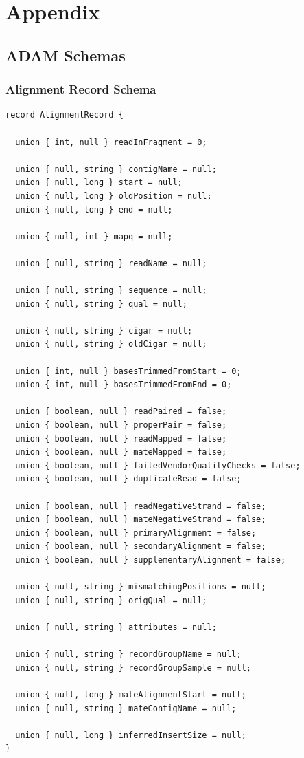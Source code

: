 \documentclass[phd]{ucbthesis}
\begin{document}
\backmatter




\appendix

\part{Appendix}

\chapter{ADAM Schemas}
\label{chap:schemas}

\section{Alignment Record Schema}
\label{sec:alignment-record}

\begin{lstlisting}[caption={ADAM} read schema]
record AlignmentRecord {
 
  union { int, null } readInFragment = 0;

  union { null, string } contigName = null;
  union { null, long } start = null;
  union { null, long } oldPosition = null;
  union { null, long } end = null;

  union { null, int } mapq = null;

  union { null, string } readName = null;

  union { null, string } sequence = null;
  union { null, string } qual = null;

  union { null, string } cigar = null;
  union { null, string } oldCigar = null;

  union { int, null } basesTrimmedFromStart = 0;
  union { int, null } basesTrimmedFromEnd = 0;

  union { boolean, null } readPaired = false;
  union { boolean, null } properPair = false;
  union { boolean, null } readMapped = false;
  union { boolean, null } mateMapped = false;
  union { boolean, null } failedVendorQualityChecks = false;
  union { boolean, null } duplicateRead = false;

  union { boolean, null } readNegativeStrand = false;
  union { boolean, null } mateNegativeStrand = false;
  union { boolean, null } primaryAlignment = false;
  union { boolean, null } secondaryAlignment = false;
  union { boolean, null } supplementaryAlignment = false;

  union { null, string } mismatchingPositions = null;
  union { null, string } origQual = null;

  union { null, string } attributes = null;

  union { null, string } recordGroupName = null;
  union { null, string } recordGroupSample = null;

  union { null, long } mateAlignmentStart = null;
  union { null, string } mateContigName = null;

  union { null, long } inferredInsertSize = null;
}
\end{lstlisting}
\end{document}
